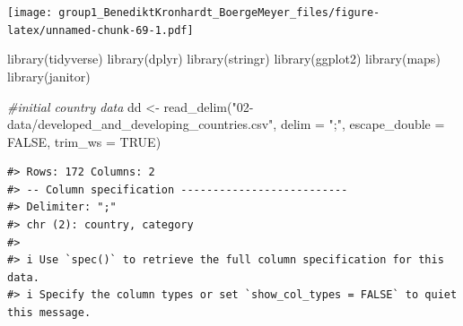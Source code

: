 \documentclass[
  11pt,
  a4paper,
  twoside]{scrbook}
\newenvironment{Shaded}{\begin{snugshade}}{\end{snugshade}}
\newcommand{\AttributeTok}[1]{\textcolor[rgb]{0.77,0.63,0.00}{#1}}
\newcommand{\CommentTok}[1]{\textcolor[rgb]{0.56,0.35,0.01}{\textit{#1}}}
\newcommand{\ConstantTok}[1]{\textcolor[rgb]{0.00,0.00,0.00}{#1}}
\newcommand{\FunctionTok}[1]{\textcolor[rgb]{0.00,0.00,0.00}{#1}}
\newcommand{\NormalTok}[1]{#1}
\newcommand{\OtherTok}[1]{\textcolor[rgb]{0.56,0.35,0.01}{#1}}
\newcommand{\StringTok}[1]{\textcolor[rgb]{0.31,0.60,0.02}{#1}}
\begin{document}
\linespread{1}\texttt{[image: group1\_BenediktKronhardt\_BoergeMeyer\_files/figure-latex/unnamed-chunk-69-1.pdf]}

\linespread{1}

\begin{Shaded}
\begin{Highlighting}[]
\FunctionTok{library}\NormalTok{(tidyverse)}
\FunctionTok{library}\NormalTok{(dplyr)}
\FunctionTok{library}\NormalTok{(stringr)}
\FunctionTok{library}\NormalTok{(ggplot2)}
\FunctionTok{library}\NormalTok{(maps)}
\FunctionTok{library}\NormalTok{(janitor)}

\CommentTok{\#initial country data}
\NormalTok{dd }\OtherTok{\textless{}{-}} \FunctionTok{read\_delim}\NormalTok{(}\StringTok{"02{-}data/developed\_and\_developing\_countries.csv"}\NormalTok{, }
                                  \AttributeTok{delim =} \StringTok{";"}\NormalTok{, }\AttributeTok{escape\_double =} \ConstantTok{FALSE}\NormalTok{,}
                                  \AttributeTok{trim\_ws =} \ConstantTok{TRUE}\NormalTok{)}
\end{Highlighting}
\end{Shaded}

\linespread{1}

\begin{verbatim}
#> Rows: 172 Columns: 2
#> -- Column specification --------------------------
#> Delimiter: ";"
#> chr (2): country, category
#> 
#> i Use `spec()` to retrieve the full column specification for this data.
#> i Specify the column types or set `show_col_types = FALSE` to quiet this message.
\end{verbatim}

\linespread{1}
\end{document}
